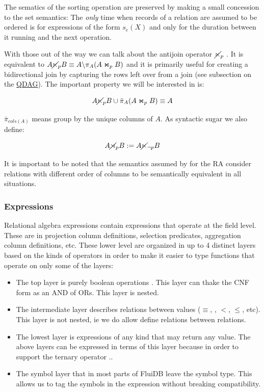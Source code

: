 The sematics of the sorting operation are preserved by making a small
concession to the set semantics: The \emph{only} time when records of a
relation are assumed to be ordered is for expressions of the form
\(s_e(X)\) and only for the duration between it running and the next
operation.

With those out of the way we can talk about the antijoin operator
\(\cancel\ltimes_p\) . It is equivalent to \(A \cancel\ltimes_p B \equiv A \backslash
\pi_A(A \Join_p B)\) and it is primarily useful for creating a
bidirectional join by capturing the rows left over from a join (see
subsection on the \hyperref[sec:org5a9ec3b]{QDAG}). The important property we will be interested
in is:

\[
  A \cancel\ltimes_p B \cup \bar\pi_A(A \Join_p B) \equiv A
\]

\(\bar{\pi}_{cols(A)}\) means group by the unique columns of \(A\).  As
syntactic sugar we also define:

\[
  A \cancel\rtimes_p B := A \cancel\ltimes_{\neg p} B
\]

It is important to be noted that the semantics assumed by for the RA
consider relations with different order of columns to be semantically
equivalent in all situations.

\subsubsection{Expressions}
\label{sec:orgaa9cf48}

Relational algebra expressions contain expressions that operate at the
field level. These are in projection column definitions, selection
predicates, aggregation column definitions, etc. These lower level are
organized in up to 4 distinct layers based on the kinds of operators
in order to make it easier to type functions that operate on only some
of the layers:

\begin{itemize}
\item The top layer is purely boolean operations . This
  layer can thake the CNF form as an AND of ORs. This layer is nested.
\item The intermediate layer  describes relations between values
  (\(\equiv\), , \(<\), \(\le\), etc). This layer is not
  nested, ie we do allow define relations between relations.
\item The lowest layer  is expressions of any kind that may
  return any value. The above layers can be expressed in terms of this
  layer because in order to support the ternary operator ..
\item The symbol layer that in most parts of FluiDB leave the symbol
  type. This allows us to tag the symbols in the expression without
  breaking compatibility.
\end{itemize}

